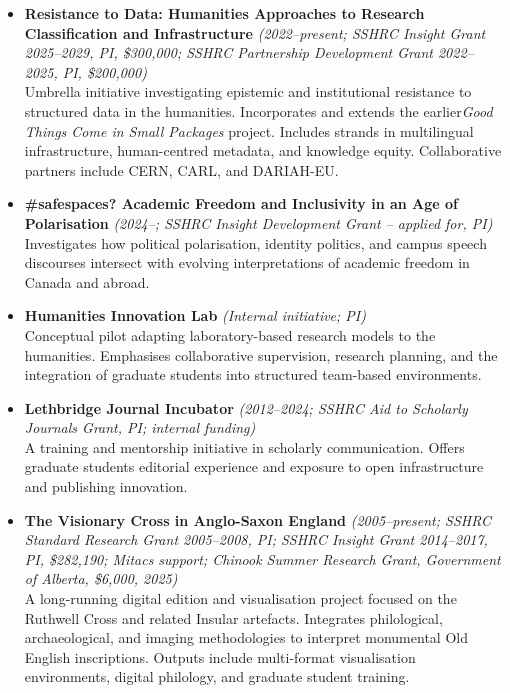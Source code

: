 \documentclass[12pt]{article}
\begin{document}
\begin{itemize}
  \item \textbf{Resistance to Data: Humanities Approaches to Research Classification and Infrastructure} \textit{(2022–present; SSHRC Insight Grant 2025–2029, PI, \$300,000; SSHRC Partnership Development Grant 2022–2025, PI, \$200,000)}\\
  Umbrella initiative investigating epistemic and institutional resistance to structured data in the humanities. Incorporates and extends the earlier\textit{Good Things Come in Small Packages} project. Includes strands in multilingual infrastructure, human-centred metadata, and knowledge equity. Collaborative partners include CERN, CARL, and DARIAH-EU.
  \item \textbf{\#safespaces? Academic Freedom and Inclusivity in an Age of Polarisation} \textit{(2024–; SSHRC Insight Development Grant – applied for, PI)}\\
  Investigates how political polarisation, identity politics, and campus speech discourses intersect with evolving interpretations of academic freedom in Canada and abroad.
  \item \textbf{Humanities Innovation Lab} \textit{(Internal initiative; PI)}\\
  Conceptual pilot adapting laboratory-based research models to the humanities. Emphasises collaborative supervision, research planning, and the integration of graduate students into structured team-based environments.
  \item \textbf{Lethbridge Journal Incubator} \textit{(2012–2024; SSHRC Aid to Scholarly Journals Grant, PI; internal funding)}\\
  A training and mentorship initiative in scholarly communication. Offers graduate students editorial experience and exposure to open infrastructure and publishing innovation.
  \item \textbf{The Visionary Cross in Anglo-Saxon England} \textit{(2005–present; SSHRC Standard Research Grant 2005–2008, PI; SSHRC Insight Grant 2014–2017, PI, \$282,190; Mitacs support; Chinook Summer Research Grant, Government of Alberta, \$6,000, 2025)}\\
  A long-running digital edition and visualisation project focused on the Ruthwell Cross and related Insular artefacts. Integrates philological, archaeological, and imaging methodologies to interpret monumental Old English inscriptions. Outputs include multi-format visualisation environments, digital philology, and graduate student training.
\end{itemize}
\end{document}

